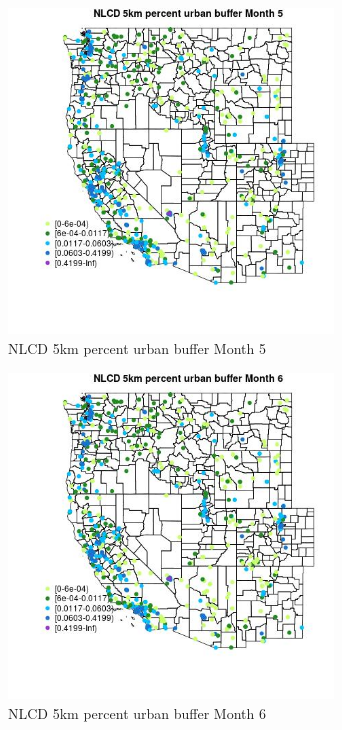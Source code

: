 \begin{figure} 
\centering  
\includegraphics[width=0.77\textwidth]{Code_Outputs/Report_ML_input_PM25_Step4_part_e_de_duplicated_aves_compiled_2019-05-14wNAs_MapObsMo5NLCD_5km_percent_urban_buffer.jpg} 
\caption{\label{fig:Report_ML_input_PM25_Step4_part_e_de_duplicated_aves_compiled_2019-05-14wNAsMapObsMo5NLCD_5km_percent_urban_buffer}NLCD 5km percent urban buffer Month 5} 
\end{figure} 
 

\begin{figure} 
\centering  
\includegraphics[width=0.77\textwidth]{Code_Outputs/Report_ML_input_PM25_Step4_part_e_de_duplicated_aves_compiled_2019-05-14wNAs_MapObsMo6NLCD_5km_percent_urban_buffer.jpg} 
\caption{\label{fig:Report_ML_input_PM25_Step4_part_e_de_duplicated_aves_compiled_2019-05-14wNAsMapObsMo6NLCD_5km_percent_urban_buffer}NLCD 5km percent urban buffer Month 6} 
\end{figure} 
 

